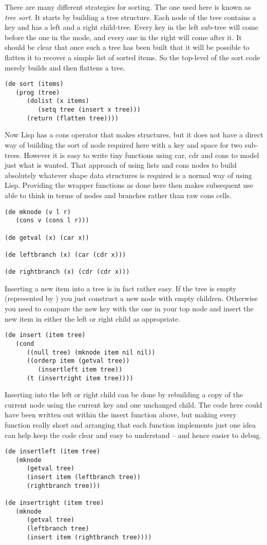 There are many different strategies for sorting. The one used here is
known as {\em tree sort}. It starts by building a tree structure. Each node
of the tree contains a key and has a left and a right child-tree. Every key
in the left sub-tree will come before the one in the mode, and every one in
the right will come after it. It should be clear that once such a tree has
been built that it will be possible to flatten it to recover a simple list
of sorted items. So the top-level of the sort code merely builds and then
flattens a tree.
{\small\begin{verbatim}
(de sort (items)
   (prog (tree)
      (dolist (x items)
         (setq tree (insert x tree)))
      (return (flatten tree))))
\end{verbatim}}

Now Lisp has a {\tx cons} operator that makes structures, but it does not
have a direct way of building the sort of node required here with a key and
space for two sub-trees. However it is easy to write tiny functions using
{\tx car}, {\tx cdr} and {\tx cons} to model just what is wanted. That
approach of using lists and {\tx cons} nodes to build absolutely whatever
shape data structures is required is a normal way of using Lisp. Providing the
wrapper functions as done here then makes subsequent use able to think in
terms of nodes and branches rather than raw {\tx cons} cells.
{\small\begin{verbatim}
(de mknode (v l r)
   (cons v (cons l r)))

(de getval (x) (car x))

(de leftbranch (x) (car (cdr x)))

(de rightbranch (x) (cdr (cdr x)))
\end{verbatim}}

Inserting a new item into a tree is in fact rather easy. If the
tree is empty (represented by \nil) you just construct a new node
with empty children. Otherwise you need to compare the new key with the
one in your top node and insert the new item in either the left or
right child as appropriate.
{\small\begin{verbatim}
(de insert (item tree)
   (cond
      ((null tree) (mknode item nil nil))
      ((orderp item (getval tree))
         (insertleft item tree))
      (t (insertright item tree))))
\end{verbatim}}

Inserting into the left or right child can be done by rebuilding a copy
of the current node using the current key and one unchanged child. The code
here could have been written out within the {\tx insert} function above, but
making every function really short and arranging that each function
implements just one idea can help keep the code clear and easy to understand -- and
hence easier to debug.
{\small\begin{verbatim}
(de insertleft (item tree)
   (mknode
      (getval tree)
      (insert item (leftbranch tree))
      (rightbranch tree)))

(de insertright (item tree)
   (mknode
      (getval tree)
      (leftbranch tree)
      (insert item (rightbranch tree))))
\end{verbatim}}

